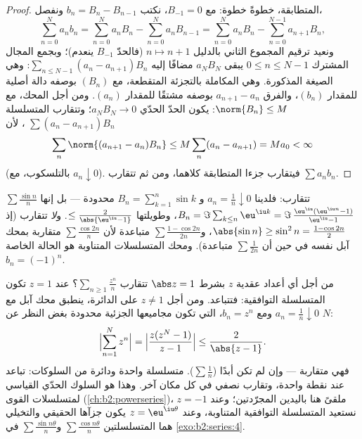 \begin{proof}
المتطابقة، خطوةً خطوة: مع $B_{-1} = 0$، نكتب $b_n = B_n -
B_{n-1}$ ونفصل،
\[
\sum_{n=0}^{N} a_nb_n
= \sum_{n=0}^{N} a_nB_n - \sum_{n=0}^{N} a_nB_{n-1}
= \sum_{n=0}^{N} a_nB_n - \sum_{n=0}^{N-1} a_{n+1}B_{n} ,
\]
ونعيد ترقيم المجموع الثاني بالدليل $n \mapsto n + 1$ (فالحدّ $B_{-1}$
ينعدم)؛ وبجمع المجال المشترك $0 \leq n \leq N-1$
يبقى $a_NB_N$ مضافًا إليه $\sum_{n\leq N-1}(a_n - a_{n+1})B_n$: وهي
الصيغة المذكورة. وهي المكاملة بالتجزئة المتقطعة، مع
$(B_n)$ بوصفه دالة أصلية للمقدار $(b_n)$، والفرق $a_{n+1}
- a_n$ بوصفه مشتقًا للمقدار $(a_n)$. ومن أجل المحك، مع $\norm{B_n}
\leq M$: يكون
الحدّ الحدّي $a_N B_N \to 0$؛ وتتقارب المتسلسلة $\sum (a_n -
a_{n+1})B_n$ ، لأن
\[
\sum_n \norm{(a_{n+1} - a_n)B_n} \leq M \sum_n (a_n - a_{n+1})
= M a_0 < \infty
\]
(بالتلسكوب، مع $a_n \downarrow 0$). فيتقارب جزءا المتطابقة كلاهما،
ومن ثم تتقارب $\sum a_n b_n$.
\end{proof}

\begin{example}\label{ex:b2:series:sinn}
$\sum \frac{\sin n}{n}$ تتقارب: فلدينا $a_n = \frac1n \downarrow 0$ و
$B_n = \sum_{k=1}^{n} \sin k$ محدودة --- بل إنها $B_n =
\Im\sum_{k \leq n} \eu^{\iu k} = \Im\,\frac{\eu^{\iu}(\eu^{\iu n} -
1)}{\eu^{\iu} - 1}$، وطويلتها $\leq \frac{2}{\abs{\eu^{\iu} - 1}}$.
و\emph{لا} تتقارب  (إذ $\abs{\sin n} \geq \sin^2 n
= \frac{1 - \cos 2n}{2}$، و$\sum \frac{1 - \cos 2n}{2n}$ متباعدة
لأن $\sum \frac{\cos 2n}{n}$ متقاربة بمحك آبل نفسه في حين أن
$\sum \frac{1}{2n}$ متباعدة). ومحك المتسلسلات المتناوبة هو
الحالة الخاصة $b_n = (-1)^n$.
\end{example}

\begin{example}\label{ex:b2:series:abelboundary}
من أجل أي أعداد عقدية $z$ بشرط $\abs z = 1$ تتقارب $\sum_{n \geq 1}
\frac{z^n}{n}$؟ عند $z = 1$ تكون المتسلسلة التوافقية:
فتتباعد. ومن أجل $z \neq 1$ على الدائرة، ينطبق محك آبل
مع $a_n = \frac1n \downarrow 0$ ومع $b_n = z^n$، التي تكون مجاميعها
الجزئية محدودة بغض النظر عن $N$:
\[
\Bigl|\sum_{n=1}^{N} z^n\Bigr|
= \Bigl|\frac{z(z^N - 1)}{z - 1}\Bigr|
\leq \frac{2}{\abs{z - 1}} .
\]
فهي متقاربة --- وإن لم تكن  أبدًا ($\sum\frac1n$). متسلسلة
واحدة ودائرة من السلوكات: تباعد عند نقطة واحدة،
وتقارب نصفي في كل مكان آخر. وهذا هو السلوك الحدّي القياسي
لمتسلسلات القوى (\cref{ch:b2:powerseries})، ملقىً هنا
باليدين المجرّدتين؛ وعند $z = -1$ نستعيد المتسلسلة
التوافقية المتناوبة، وعند $z = \eu^{\iu\theta}$ يكون جزآها الحقيقي
والتخيلي هما المتسلسلتين $\sum\frac{\cos
n\theta}{n}$ و$\sum\frac{\sin n\theta}{n}$ في
\cref{exo:b2:series:4}.
\end{example}

